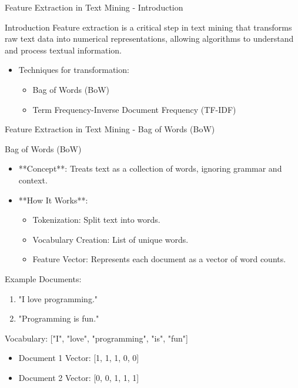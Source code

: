 \documentclass[aspectratio=169]{beamer}
\begin{document}
\begin{frame}[fragile]{Feature Extraction in Text Mining - Introduction}
  \begin{block}{Introduction}
    Feature extraction is a critical step in text mining that transforms raw text data into numerical representations, allowing algorithms to understand and process textual information. 
  \end{block}
  
  \begin{itemize}
    \item Techniques for transformation:
      \begin{itemize}
        \item Bag of Words (BoW)
        \item Term Frequency-Inverse Document Frequency (TF-IDF)
      \end{itemize}
  \end{itemize}
\end{frame}

\begin{frame}[fragile]{Feature Extraction in Text Mining - Bag of Words (BoW)}
  \begin{block}{Bag of Words (BoW)}
    \begin{itemize}
      \item **Concept**: Treats text as a collection of words, ignoring grammar and context.
      \item **How It Works**:
      \begin{itemize}
        \item Tokenization: Split text into words.
        \item Vocabulary Creation: List of unique words.
        \item Feature Vector: Represents each document as a vector of word counts.
      \end{itemize}
    \end{itemize}
  \end{block}

  \begin{block}{Example}
    Documents:
    \begin{enumerate}
      \item "I love programming."
      \item "Programming is fun."
    \end{enumerate}
    
    Vocabulary: ["I", "love", "programming", "is", "fun"]

    \begin{itemize}
      \item Document 1 Vector: [1, 1, 1, 0, 0]
      \item Document 2 Vector: [0, 0, 1, 1, 1]
    \end{itemize}
  \end{block}
\end{frame}
\end{document}
